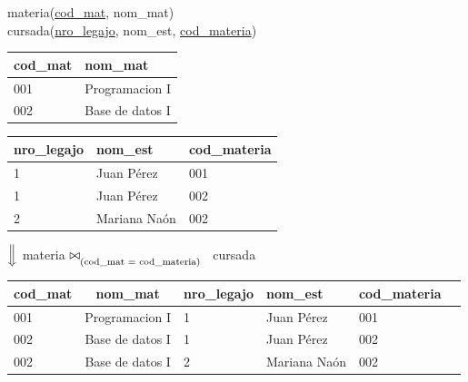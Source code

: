 \documentclass[preview]{standalone}
\begin{document}
materia(\underline{cod\_mat}, nom\_mat)\\
cursada(\underline{nro\_legajo}, nom\_est, \underline{cod\_materia})\\

\begin{center}
\begin{tabular}{| l | l | }\hline			
	cod\_mat & nom\_mat \\\hline			
	001 & Programacion I \\
	002 & Base de datos I \\\hline
\end{tabular}
\quad
\begin{tabular}{| l | l | l | }\hline			
	nro\_legajo & nom\_est & cod\_materia \\\hline			
	1 & Juan P\'erez & 001\\
	1 & Juan P\'erez & 002\\
	2 & Mariana Na\'on & 002 \\\hline
\end{tabular}
\vspace{.35cm}

$\Big\Downarrow$ materia ${\Large\bowtie_{\textsubscript{(cod\_mat = cod\_materia)}}}$ \ cursada 
\vspace{.35cm}

\begin{tabular}{| l | c | l | l | l | l | }\hline			
	cod\_mat & nom\_mat & nro\_legajo & nom\_est & cod\_materia \\\hline			
	001 & Programacion I & 1 & Juan P\'erez & 001  \\
	002 & Base de datos I & 1 & Juan P\'erez & 002 \\
	002 & Base de datos I & 2 & Mariana Na\'on & 002 \\\hline
\end{tabular}
\end{center}
\end{document}
